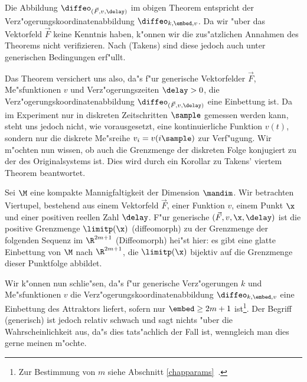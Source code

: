 Die Abbildung $\diffeo_{(\vec F,v,\delay)}$ im obigen Theorem entspricht der
Verz"ogerungskoordinatenabbildung $\diffeo_{k,\embed,v}$.  Da wir "uber das Vektorfeld
$\vec F$ keine Kenntnis haben, k"onnen wir die zus"atzlichen Annahmen des Theorems nicht
verifizieren. Nach \autor(Takens) sind diese jedoch auch unter generischen Bedingungen
erf"ullt. 

Das Theorem versichert uns also, da"s f"ur generische Vektorfelder $\vec F$,
Me"sfunktionen $v$ und Verz"ogerungszeiten $\delay>0$, die
Verz"ogerungskoordinatenabbildung $\diffeo_{(\vec F,v,\delay)}$ eine Einbettung ist. Da im
Experiment nur in diskreten Zeitschritten $\sample$ gemessen werden kann, steht uns jedoch
nicht, wie vorausgesetzt, eine kontinuierliche Funktion $v(t)$, sondern nur die diskrete
Me"sreihe $v_i=v(i\sample)$ zur Verf"ugung. Wir m"ochten nun wissen, ob auch die
Grenzmenge der diskreten Folge konjugiert zu der des Originalsystems ist. Dies wird durch
ein Korollar zu Takens' viertem Theorem beantwortet.

\begin{corollar}
Sei $\M$ eine kompakte Mannigfaltigkeit der Dimension $\mandim$. Wir betrachten Viertupel,
bestehend aus einem Vektorfeld $\vec F$, einer Funktion $v$, einem Punkt $\x$ und einer
positiven reellen Zahl $\delay$. F"ur generische $(\vec F, v, \x, \delay)$ ist die
positive Grenzmenge $\limitp(\x)$ \naja(diffeomorph) zu der Grenzmenge der folgenden
Sequenz im $\R^{2m+1}$
\naja(Diffeomorph) hei"st hier: es gibt eine glatte Einbettung von $\M$ nach $\R^{2m+1}$,
die $\limitp(\x)$ bijektiv auf die Grenzmenge dieser Punktfolge abbildet.
\end{corollar}

Wir k"onnen nun schlie"sen, da"s f"ur generische Verz"ogerungen $k$ und Me"sfunktionen
$v$ die Verz"ogerungskoordinatenabbildung $\diffeo_{k,\embed,v}$ eine Einbettung des
Attraktors liefert, sofern nur $\embed\geq2m+1$ ist\footnote{Zur Bestimmung von $m$ siehe
  Abschnitt \ref{chapparams}~.}.
Der Begriff \naja(generisch) ist jedoch relativ schwach und sagt nichts "uber die
Wahrscheinlichkeit aus, da"s dies tats"achlich der Fall ist, wenngleich man dies gerne
meinen m"ochte. 

